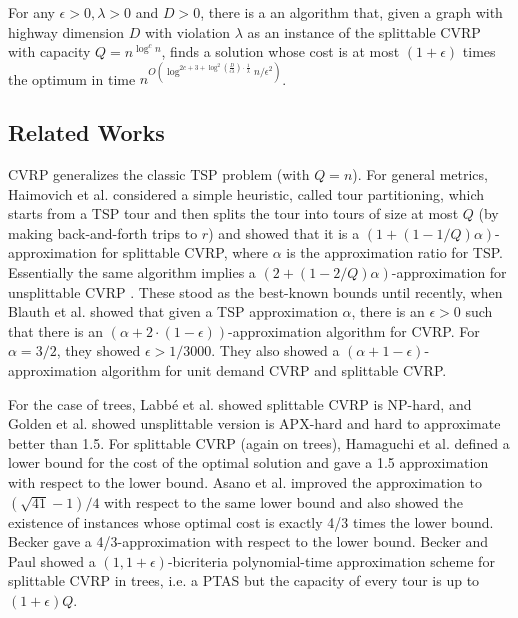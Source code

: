 \documentclass[twoside,leqno]{article}
\newcommand{\eps}{\epsilon}
\begin{document}
\begin{theorem}\label{thm:HD}
For any $\eps > 0, \lambda > 0$ and $D > 0$, there is a an algorithm that, given a graph with highway dimension $D$ with violation $\lambda$ as an instance of the splittable CVRP with capacity $Q = n^{\log^c n}$, finds a solution whose cost is at most $(1 + \eps)$ times the optimum in time $n^{O( \log^{2c + 3 + \log^2(\frac{D}{\eps \lambda})\cdot \frac{1}{\lambda}}n/\eps^2)}$.
\end{theorem}

\subsection{Related Works}
CVRP generalizes the classic TSP problem (with $Q=n$).
For general metrics, Haimovich et al. \cite{Haimovich-Kan} considered a simple heuristic, called tour partitioning, which starts from a TSP tour and then splits the tour into tours of size at most $Q$ (by making back-and-forth trips to $r$) and showed that it is a $(1 + (1 - 1/Q)\alpha)$-approximation for splittable CVRP, where $\alpha$ is the approximation ratio for TSP. Essentially the same algorithm implies a $(2 + (1 - 2/Q)\alpha)$-approximation for unsplittable CVRP \cite{ALTINKEMER1987149}. These stood as the best-known bounds until recently, when Blauth et al. \cite{Vygen} showed that given a TSP approximation $\alpha$, there is an $\eps > 0$ such that there is an $(\alpha + 2 \cdot (1 - \eps))$-approximation algorithm for CVRP. For $\alpha = 3/2$, they showed $\eps > 1/3000$. They also showed a $(\alpha + 1 - \eps)$-approximation algorithm for unit demand CVRP and splittable CVRP.

For the case of trees, Labbé et al. \cite{Labbe-Mercure} showed splittable CVRP is NP-hard, and Golden et al. \cite{Golden-Wong} showed unsplittable version is APX-hard and hard to approximate better than 1.5. For splittable CVRP (again on trees), Hamaguchi et al. \cite{Hamaguchi-Katoh} defined a lower bound for the cost of the optimal solution and gave a 1.5 approximation with respect to the lower bound. Asano et al. \cite{stoc/AsanoKTT97} improved the approximation to $(\sqrt{41} - 1)/4$ with respect to the same lower bound and also showed the existence of instances whose optimal cost is exactly 4/3 times the lower bound. Becker \cite{Becker18} gave a 4/3-approximation with respect to the  lower bound. Becker and Paul \cite{Becker-Paul-Bricriteria} showed a $(1, 1+ \eps)$-bicriteria polynomial-time approximation scheme for splittable CVRP in trees, i.e. a PTAS but the capacity of every tour is up to $(1+\eps)Q$.
\end{document}
